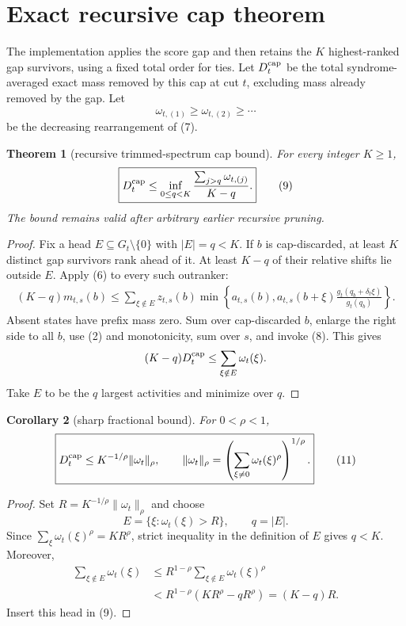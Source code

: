 \documentclass[11pt]{article}
\newtheorem{theorem}{Theorem}
\newtheorem{corollary}[theorem]{Corollary}
\newcommand{\1}{\mathbf 1}
\newcommand{\caploss}{D_t^{\rm cap}}
\begin{document}
\section{Exact recursive cap theorem}

The implementation applies the score gap and then retains the \(K\)
highest-ranked gap survivors, using a fixed total order for ties.  Let
\(\caploss\) be the total syndrome-averaged exact mass removed by this cap at
cut \(t\), excluding mass already removed by the gap.  Let
\[
  \omega_{t,(1)}\ge\omega_{t,(2)}\ge\cdots
\]
be the decreasing rearrangement of (7).

\begin{theorem}[recursive trimmed-spectrum cap bound]
For every integer \(K\ge1\),
\[
\boxed{
 \caploss\le
 \inf_{0\le q<K}
 \frac{\sum_{j>q}\omega_{t,(j)}}{K-q}.}
 \tag{9}
\]
The bound remains valid after arbitrary earlier recursive pruning.
\end{theorem}

\begin{proof}
Fix a head \(E\subseteq G_t\setminus\{0\}\) with \(|E|=q<K\).  If \(b\)
is cap-discarded, at least \(K\) distinct gap survivors rank ahead of it.  At
least \(K-q\) of their relative shifts lie outside \(E\).  Apply (6) to every
such outranker:
\[
\begin{split}
 (K-q)m_{t,s}(b)
 \le\sum_{\xi\notin E}z_{t,s}(b)
 \min\left\{
 a_{t,s}(b),
 a_{t,s}(b+\xi)
 \frac{g_t(q_b+\delta_t\xi)}{g_t(q_b)}
 \right\}.
\end{split}
\tag{10}
\]
Absent states have prefix mass zero.  Sum over cap-discarded \(b\), enlarge
the right side to all \(b\), use (2) and monotonicity, sum over \(s\), and
invoke (8).  This gives
\[
  (K-q)\caploss\le\sum_{\xi\notin E}\omega_t(\xi).
\]
Take \(E\) to be the \(q\) largest activities and minimize over \(q\).
\end{proof}

\begin{corollary}[sharp fractional bound]
For \(0<\rho<1\),
\[
\boxed{
  \caploss\le K^{-1/\rho}\|\omega_t\|_\rho,\qquad
  \|\omega_t\|_\rho=
  \left(\sum_{\xi\ne0}\omega_t(\xi)^\rho\right)^{1/\rho}.}
  \tag{11}
\]
\end{corollary}

\begin{proof}
Set \(R=K^{-1/\rho}\|\omega_t\|_\rho\) and choose
\[
  E=\{\xi:\omega_t(\xi)>R\},\qquad q=|E|.
\]
Since \(\sum_\xi\omega_t(\xi)^\rho=KR^\rho\), strict inequality in the
definition of \(E\) gives \(q<K\).  Moreover,
\[
\begin{split}
 \sum_{\xi\notin E}\omega_t(\xi)
 &\le R^{1-\rho}
       \sum_{\xi\notin E}\omega_t(\xi)^\rho\\
 &<R^{1-\rho}(KR^\rho-qR^\rho)
  =(K-q)R.
\end{split}
\]
Insert this head in (9).
\end{proof}
\end{document}
